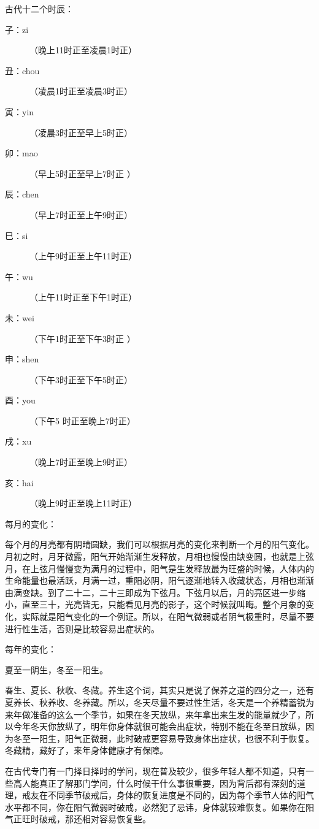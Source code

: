 \documentclass[fontset=founder]{ctexart}
\begin{document}
古代十二个时辰：

\begin{description}
    \item[子：zi] （晚上11时正至凌晨1时正）
    \item[丑：chou] （凌晨1时正至凌晨3时正）
    \item[寅：yin] （凌晨3时正至早上5时正）
    \item[卯：mao] （早上5时正至早上7时正 ）
    \item[辰：chen] （早上7时正至上午9时正）
    \item[巳：si] （上午9时正至上午11时正）
    \item[午：wu] （上午11时正至下午1时正）
    \item[未：wei] （下午1时正至下午3时正 ）
    \item[申：shen] （下午3时正至下午5时正）
    \item[酉：you] （下午5 时正至晚上7时正）
    \item[戌：xu] （晚上7时正至晚上9时正）
    \item[亥：hai] （晚上9时正至晚上11时正）
\end{description}

每月的变化：

每个月的月亮都有阴晴圆缺，我们可以根据月亮的变化来判断一个月的阳气变化。月初之时，月牙微露，阳气开始渐渐生发释放，月相也慢慢由缺变圆，也就是上弦月，在上弦月慢慢变为满月的过程中，阳气是生发释放最为旺盛的时候，人体内的生命能量也最活跃，月满一过，重阳必阴，阳气逐渐地转入收藏状态，月相也渐渐由满变缺。到了二十二，二十三即成为下弦月。下弦月以后，月的亮区进一步缩小，直至三十，光亮皆无，只能看见月亮的影子，这个时候就叫晦。整个月象的变化，实际就是阳气变化的一个例证。所以，在阳气微弱或者阴气极重时，尽量不要进行性生活，否则是比较容易出症状的。

每年的变化：

夏至一阴生，冬至一阳生。

春生、夏长、秋收、冬藏。养生这个词，其实只是说了保养之道的四分之一，还有夏养长、秋养收、冬养藏。所以，冬天尽量不要过性生活，冬天是一个养精蓄锐为来年做准备的这么一个季节，如果在冬天放纵，来年拿出来生发的能量就少了，所以今年冬天你放纵了，明年你身体就很可能会出症状，特别不能在冬至日放纵，因为冬至一阳生，阳气正微弱，此时破戒更容易导致身体出症状，也很不利于恢复。冬藏精，藏好了，来年身体健康才有保障。

在古代专门有一门择日择时的学问，现在普及较少，很多年轻人都不知道，只有一些高人能真正了解那门学问，什么时候干什么事很重要，因为背后都有深刻的道理，戒友在不同季节破戒后，身体的恢复进度是不同的，因为每个季节人体的阳气水平都不同，你在阳气微弱时破戒，必然犯了忌讳，身体就较难恢复。如果你在阳气正旺时破戒，那还相对容易恢复些。
\end{document}
